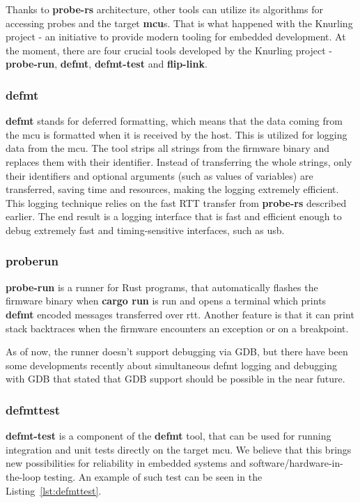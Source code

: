 Thanks to \textbf{probe-rs} architecture, other tools can utilize its algorithms for accessing probes and the target \textbf{mcu}s.
That is what happened with the Knurling project - an initiative to provide modern tooling for embedded development.
At the moment, there are four crucial tools developed by the Knurling project - \textbf{probe-run}, \textbf{defmt}, \textbf{defmt-test} and \textbf{flip-link}.

\subsubsection{defmt}
\textbf{defmt} stands for deferred formatting\cite{knurling_project_knurling-rsdefmt_2021}, which means that the data coming from the \acs{mcu} is formatted when it is received by the host.
This is utilized for logging data from the \acs{mcu}.
The tool strips all strings from the firmware binary and replaces them with their identifier.
Instead of transferring the whole strings, only their identifiers and optional arguments (such as values of variables) are transferred, saving time and resources, making the logging extremely efficient.
This logging technique relies on the fast RTT transfer from \textbf{probe-rs} described earlier.
The end result is a logging interface that is fast and efficient enough to debug extremely fast and timing-sensitive interfaces, such as \acs{usb}.

\subsubsection{probe\textendash run}
\textbf{probe-run} is a runner for Rust programs\cite{knurling_project_knurling-rsprobe-run_2021}, that automatically flashes the firmware binary when \textbf{cargo run} is run and opens a terminal which prints \textbf{defmt} encoded messages transferred over \acs{rtt}.
Another feature is that it can print stack backtraces when the firmware encounters an exception or on a breakpoint.

As of now, the runner doesn't support debugging via GDB, but there have been some developments recently about simultaneous defmt logging and debugging with GDB that stated that GDB support should be possible in the near future\cite{aparicio_using_nodate}.

\subsubsection{defmt\textendash test}
\label{subsubsec:defmttest}
\textbf{defmt-test} is a component of the \textbf{defmt} tool, that can be used for running integration and unit tests directly on the target \acs{mcu}.
We believe that this brings new possibilities for reliability in embedded systems and software/hardware-in-the-loop testing.
An example of such test can be seen in the Listing~\ref{lst:defmttest}\cite{knurling_project_knurling-rsdefmt_2021}.

